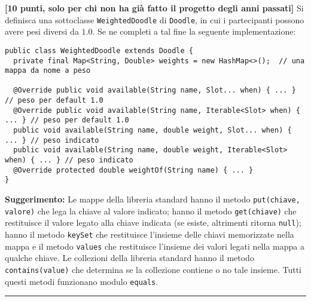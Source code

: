 \documentclass{article}[10pt]
\newcounter{esnu}
\newenvironment{esercizio}{\medskip \noindent {\bf Esercizio\addtocounter{esnu}{1} \arabic{esnu}}}{}
\begin{document}
\begin{esercizio}
\textbf{[10 punti, solo per chi non ha gi\`a fatto il progetto degli anni passati]}
Si definisca una sottoclasse \texttt{WeightedDoodle} di \texttt{Doodle}, in cui
i partecipanti possono avere pesi diversi da $1.0$.
Se ne completi a tal fine la seguente implementazione:

{\small\begin{verbatim}
public class WeightedDoodle extends Doodle {
  private final Map<String, Double> weights = new HashMap<>();  // una mappa da nome a peso

  @Override public void available(String name, Slot... when) { ... } // peso per default 1.0
  @Override public void available(String name, Iterable<Slot> when) { ... } // peso per default 1.0
  public void available(String name, double weight, Slot... when) { ... } // peso indicato
  public void available(String name, double weight, Iterable<Slot> when) { ... } // peso indicato
  @Override protected double weightOf(String name) { ... }
}
\end{verbatim}}

  \noindent
  \textbf{Suggerimento:}
  Le mappe della libreria standard hanno il metodo \texttt{put(chiave, valore)} che lega
  la chiave al valore indicato; hanno il metodo \texttt{get(chiave)} che restituisce il
  valore legato alla chiave indicata (se esiste, altrimenti ritorna \texttt{null});
  hanno il metodo \texttt{keySet} che restituisce l'insieme delle chiavi memorizzate
  nella mappa e il metodo \texttt{values} che restituisce l'insieme dei valori
  legati nella mappa a qualche chiave.
  Le collezioni della libreria standard hanno il metodo \texttt{contains(value)} che
  determina se la collezione contiene o no tale insieme. Tutti questi metodi funzionano
  modulo \texttt{equals}.
\end{esercizio}

\vspace*{2ex}
\hrule

\mbox{}\\
\end{document}
